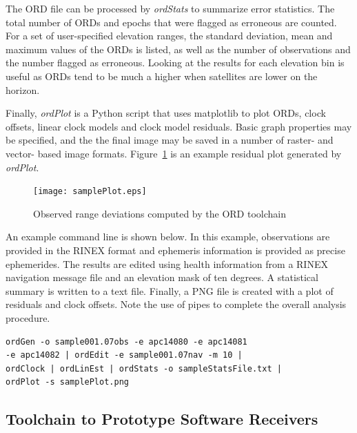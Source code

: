 \documentclass[letterpaper,ugly,10pt]{ion-gps}
\newcommand{\gpstkapp}[1]{\textit{\mbox{#1}}}
\begin{document}
The ORD file can be processed by \gpstkapp{ordStats} to summarize error statistics. The total number of ORDs and epochs that were flagged as erroneous are counted. For a set of user-specified elevation ranges, the standard deviation, mean and maximum values of the ORDs is listed, as well as the number of observations and the number flagged as erroneous. Looking at the results for each elevation bin is useful as ORDs tend to be much a higher when satellites are lower on the horizon.

Finally, \gpstkapp{ordPlot} is a Python \cite{python} script that uses matplotlib \cite{matplotlib} to plot ORDs, clock offsets, linear clock models and clock model residuals. Basic graph properties may be specified, and the the final image may be saved in a number of raster- and vector- based image formats. Figure~\ref{fig:ordplotoutput} is an example residual plot generated by \gpstkapp{ordPlot}.
\begin{figure}
	\centering
	\texttt{[image: samplePlot.eps]}
	\caption{Observed range deviations computed by the ORD toolchain}
	\label{fig:ordplotoutput}
\end{figure}

An example command line is shown below. In this example, observations are provided in the RINEX format and ephemeris information is provided as precise ephemerides. The results are edited using health information from a RINEX navigation message file and an elevation mask of ten degrees. A statistical summary is written to a text file. Finally, a PNG file is created with a plot of residuals and clock offsets. Note the use of pipes to complete the overall analysis procedure.

\begin{scriptsize}
\begin{lstlisting}
ordGen -o sample001.07obs -e apc14080 -e apc14081 
-e apc14082 | ordEdit -e sample001.07nav -m 10 | 
ordClock | ordLinEst | ordStats -o sampleStatsFile.txt |
ordPlot -s samplePlot.png
\end{lstlisting}
\end{scriptsize}


\subsection*{Toolchain to Prototype Software Receivers}
\end{document}
